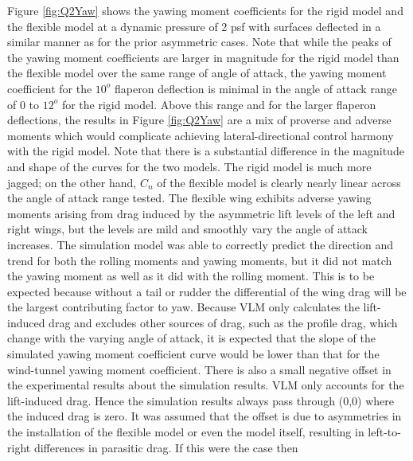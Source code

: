 \documentclass[11pt]{ucthesis}
\begin{document}
Figure \ref{fig:Q2Yaw} shows the yawing moment coefficients for the rigid model and the flexible model at a dynamic pressure of 2 psf with surfaces deflected in a similar manner as for the prior asymmetric cases. Note that while the peaks of the yawing moment coefficients are larger in magnitude for the rigid model than the flexible model over the same range of angle of attack, the yawing moment coefficient for the $10^o$ flaperon deflection is minimal in the angle of attack range of 0 to $12^o$ for the rigid model. Above this range and for the larger flaperon deflections, the results in Figure \ref{fig:Q2Yaw} are a mix of proverse and adverse moments which would complicate achieving lateral-directional control harmony with the rigid model. Note that there is a substantial difference in the magnitude and shape of the curves for the two models. The rigid model is much more jagged; on the other hand, $C_n$ of the flexible model is clearly nearly linear across the angle of attack range tested. The flexible wing exhibits adverse yawing moments arising from drag induced by the asymmetric lift levels of the left and right wings, but the levels are mild and smoothly vary the angle of attack increases.
The simulation model was able to correctly predict the direction and trend for both the rolling moments and yawing moments, but it did not match the yawing moment as well as it did with the rolling moment. This is to be expected because without a tail or rudder the differential of the wing drag will be the largest contributing factor to yaw. Because VLM only calculates the lift-induced drag and excludes other sources of drag, such as the profile drag, which change with the varying angle of attack, it is expected that the slope of the simulated yawing moment coefficient curve would be lower than that for the wind-tunnel yawing moment coefficient. There is also a small negative offset in the experimental results about the simulation results. VLM only accounts for the lift-induced drag. Hence the simulation results always pass through (0,0) where the induced drag is zero. It was assumed that the offset is due to asymmetries in the installation of the flexible model or even the model itself, resulting in left-to-right differences in parasitic drag. If this were the case then 
\end{document}

